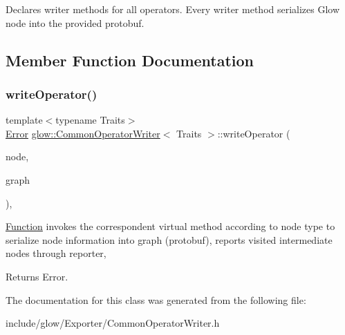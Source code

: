 Declares writer methods for all operators. Every writer method serializes Glow node into the provided protobuf. 

\subsection{Member Function Documentation}
\mbox{\label{classglow_1_1_common_operator_writer_a5b62bfd291a1f6182a3882657686ccb9}} 
\subsubsection{\texorpdfstring{write\+Operator()}{writeOperator()}}
{\footnotesize\ttfamily template$<$typename Traits$>$ \\
\hyperlink{namespaceglow_afdb176c3a672ef66db0ecfc19a8d39bf}{Error} \hyperlink{classglow_1_1_common_operator_writer}{glow\+::\+Common\+Operator\+Writer}$<$ Traits $>$\+::write\+Operator (\begin{DoxyParamCaption}\item[{const \hyperlink{classglow_1_1_node}{Node} $\ast$}]{node,  }\item[{typename Traits\+::\+Graph\+Proto \&}]{graph }\end{DoxyParamCaption})\hspace{0.3cm}{\ttfamily [inline]}, {\ttfamily [protected]}}

\hyperlink{classglow_1_1_function}{Function} invokes the correspondent virtual method according to {\ttfamily node} type to serialize node information into {\ttfamily graph} (protobuf), reports visited intermediate nodes through {\ttfamily reporter}, \begin{DoxyReturn}{Returns}
Error. 
\end{DoxyReturn}


The documentation for this class was generated from the following file\+:\begin{DoxyCompactItemize}
\item 
include/glow/\+Exporter/Common\+Operator\+Writer.\+h\end{DoxyCompactItemize}
